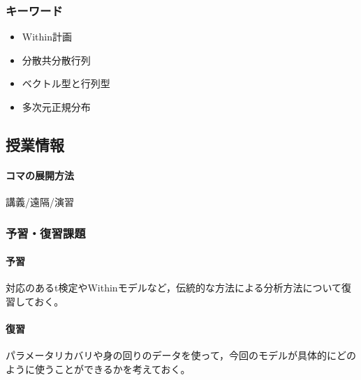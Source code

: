 \subsubsection{キーワード}
\begin{itemize}
	\item Within計画
	\item 分散共分散行列
	\item ベクトル型と行列型
	\item 多次元正規分布
\end{itemize}
\subsection{授業情報}
\paragraph{コマの展開方法}
講義/遠隔/演習
\subsubsection{予習・復習課題}
\paragraph{予習}対応のあるt検定やWithinモデルなど，伝統的な方法による分析方法について復習しておく。
\paragraph{復習}パラメータリカバリや身の回りのデータを使って，今回のモデルが具体的にどのように使うことができるかを考えておく。